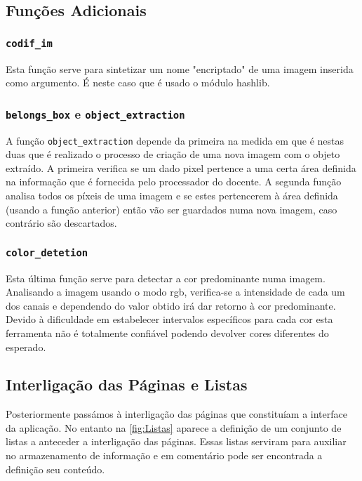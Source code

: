 \documentclass{report}
\begin{document}
\subsection{Funções Adicionais}
\subsubsection{\texttt{codif\_im}}

Esta função serve para sintetizar um nome "encriptado" de uma imagem inserida como argumento.
É neste caso que é usado o módulo hashlib.

\subsubsection{\texttt{belongs\_box} e  \texttt{object\_extraction}}

A função \texttt{object\_extraction} depende da primeira na medida em que é nestas duas que é realizado o processo de criação de uma nova imagem com o objeto extraído. A primeira verifica se um dado pixel pertence a uma certa área definida na informação que é fornecida pelo processador do docente. A segunda função analisa todos os píxeis de uma imagem e se estes pertencerem à área definida (usando a função anterior) então vão ser guardados numa nova imagem, caso contrário são descartados. 

\subsubsection{\texttt{color\_detetion}}
Esta última função serve para detectar a cor predominante numa imagem. Analisando a imagem usando o modo rgb, verifica-se a intensidade de cada um dos canais e dependendo do valor obtido irá dar retorno à cor predominante. Devido à dificuldade em estabelecer intervalos específicos para cada cor esta ferramenta não é totalmente confiável podendo devolver cores diferentes do esperado. 


\subsection{Interligação das Páginas e Listas}

Posteriormente passámos à interligação das páginas que constituíam a interface da aplicação. No entanto na \autoref{fig:Listas} aparece a definição de um conjunto de listas a anteceder a interligação das páginas. Essas listas serviram para auxiliar no armazenamento de informação e em comentário pode ser encontrada a definição seu conteúdo.
\end{document}
